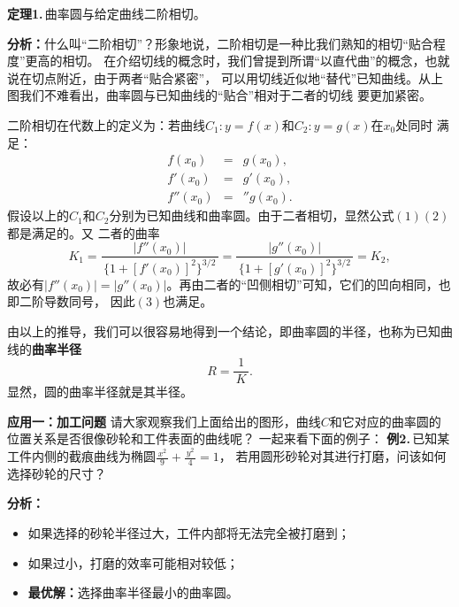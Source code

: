 \documentclass[a4paper]{article}
\newcommand*{\df}[2]{\displaystyle\frac{\,{#1}\,}{\,{#2}\,}}
\begin{document}
{\bf 定理1.}\,曲率圆与给定曲线二阶相切。

{\bf 分析：}什么叫“二阶相切”？形象地说，二阶相切是一种比我们熟知的相切“贴合程度”更高的相切。
在介绍切线的概念时，我们曾提到所谓“以直代曲”的概念，也就说在切点附近，由于两者“贴合紧密”，
可以用切线近似地“替代”已知曲线。从上图我们不难看出，曲率圆与已知曲线的“贴合”相对于二者的切线
要更加紧密。

二阶相切在代数上的定义为：若曲线$C_1:y=f(x)$和$C_2:y=g(x)$在$x_0$处同时
满足：
\begin{eqnarray}
	f(x_0)&=&g(x_0),\\
	f'(x_0)&=&g'(x_0),\\
	f''(x_0)&=&''g(x_0).
\end{eqnarray}
假设以上的$C_1$和$C_2$分别为已知曲线和曲率圆。由于二者相切，显然公式$(1)(2)$都是满足的。又
二者的曲率
$$K_1=\df{|f''(x_0)|}{\{1+[f'(x_0)]^2\}^{3/2}}=\df{|g''(x_0)|}{\{1+[g'(x_0)]^2\}^{3/2}}=K_2,$$
故必有$|f''(x_0)|=|g''(x_0)|$。再由二者的“凹侧相切”可知，它们的凹向相同，也即二阶导数同号，
因此$(3)$也满足。

由以上的推导，我们可以很容易地得到一个结论，即曲率圆的半径，也称为已知曲线的{\bf 曲率半径}
$$R=\df 1K.$$
显然，圆的曲率半径就是其半径。

{\bf 应用一：加工问题}
请大家观察我们上面给出的图形，曲线$C$和它对应的曲率圆的位置关系是否很像砂轮和工件表面的曲线呢？
一起来看下面的例子：
{\bf 例2.}\,已知某工件内侧的截痕曲线为椭圆$\df{x^2}9+\df{y^2}4=1$，
若用圆形砂轮对其进行打磨，问该如何选择砂轮的尺寸？
\begin{center}
\end{center}
{\bf 分析：}
\begin{itemize}
  \item 如果选择的砂轮半径过大，工件内部将无法完全被打磨到；
  \item 如果过小，打磨的效率可能相对较低；
  \item {\bf 最优解：}选择曲率半径最小的曲率圆。
\end{itemize}
\end{document}
